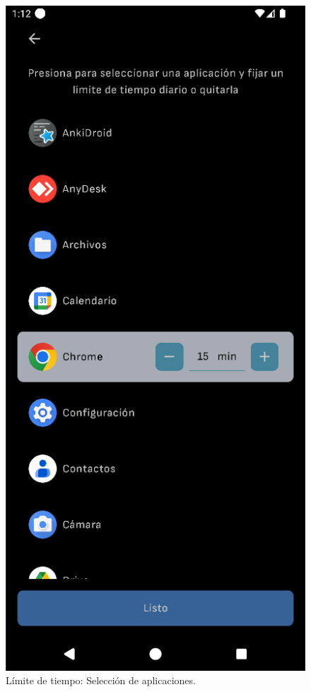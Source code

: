 \begin{figure}[ht!]
\begin{minipage}{0.43\textwidth}
  \end{minipage}\hspace{0.05\textwidth}
  \begin{minipage}{0.43\textwidth}
    \caption{Límite de tiempo: Selección de aplicaciones.}
    \label{fig:seleccionar_aplicaciones_limite_tiempo}
    \includegraphics[width=\textwidth]{Figuras/secciones/seleccionar_aplicaciones_limite_tiempo.png}
    \centering
  \end{minipage}
\end{figure}

